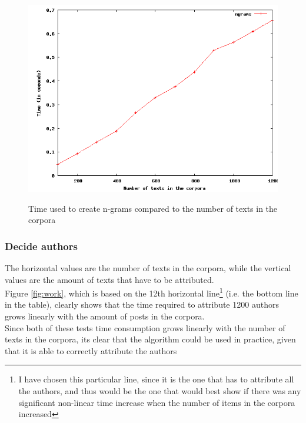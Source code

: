 \begin{figure}[!hbp]
\includegraphics[width=\textwidth]{tabeller/ngram.png}\\
\caption{Time used to create n-grams compared to the number of texts in the corpora\label{fig:ngram}}
\end{figure}

\subsubsection{Decide authors}
The horizontal values are the number of texts in the corpora, while the vertical values are the amount of texts that have to be attributed.\\


Figure \ref{fig:work}, which is based on the 12th horizontal line\footnote{I have chosen this particular line, since it is the one that has to attribute all the authors, and thus would be the one that would best show if there was any significant non-linear time increase when the number of items in the corpora increased} (i.e. the bottom line in the table), clearly shows that the time required to attribute 1200 authors grows linearly with the amount of posts in the corpora.\\

Since both of these tests time consumption grows linearly with the number of texts in the corpora, its clear that the algorithm could be used in practice, given that it is able to correctly attribute the authors  

